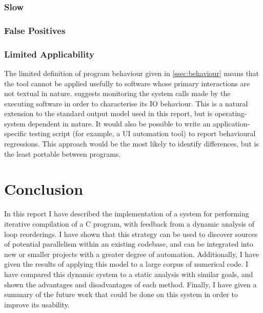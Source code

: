 \documentclass[journal]{IEEEtran}
\begin{document}
\subsubsection{Slow}

\subsubsection{False Positives}

\subsubsection{Limited Applicability} The limited definition of program
behaviour given in \autoref{ssec:behaviour} means that the tool cannot be
applied usefully to software whose primary interactions are not textual in
nature. \textcite{layton_io_2010} suggests monitoring the system calls made by
the executing software in order to characterise its IO behaviour. This is a
natural extension to the standard output model used in this report, but is
operating-system dependent in nature. It would also be possible to write an
application-specific testing script (for example, a UI automation tool) to
report behavioural regressions. This approach would be the most likely to
identify differences, but is the least portable between programs.

\section{Conclusion}

In this report I have described the implementation of a system for performing
iterative compilation of a C program, with feedback from a dynamic analysis of
loop reorderings. I have shown that this strategy can be used to discover
sources of potential parallelism within an existing codebase, and can be
integrated into new or smaller projects with a greater degree of automation.
Additionally, I have given the results of applying this model to a large corpus
of numerical code. I have compared this dynamic system to a static analysis with
similar goals, and shown the advantages and disadvantages of each method.
Finally, I have given a summary of the future work that could be done on this
system in order to improve its usability.

\ifCLASSOPTIONcaptionsoff
  \newpage
\fi

\printbibliography
\end{document}
